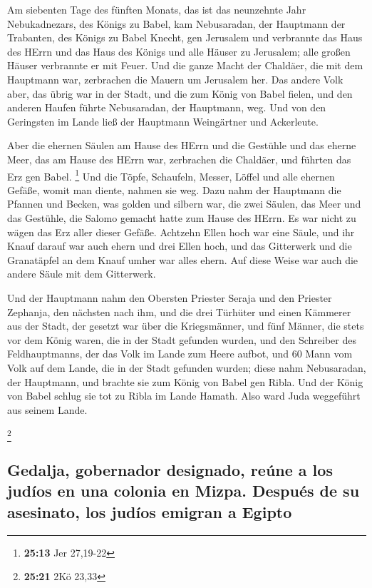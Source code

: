  Am siebenten Tage des fünften Monats, das ist das
neunzehnte Jahr Nebukadnezars, des Königs zu Babel, kam Nebusaradan, der
Hauptmann der Trabanten, des Königs zu Babel Knecht, gen Jerusalem
 und verbrannte das Haus des HErrn und das Haus des Königs
und alle Häuser zu Jerusalem; alle großen Häuser verbrannte er mit
Feuer.  Und die ganze Macht der Chaldäer, die mit dem
Hauptmann war, zerbrachen die Mauern um Jerusalem her. 
Das andere Volk aber, das übrig war in der Stadt, und die zum König von
Babel fielen, und den anderen Haufen führte Nebusaradan, der Hauptmann,
weg.  Und von den Geringsten im Lande ließ der Hauptmann
Weingärtner und Ackerleute.

 Aber die ehernen Säulen am Hause des HErrn und die
Gestühle und das eherne Meer, das am Hause des HErrn war, zerbrachen die
Chaldäer, und führten das Erz gen Babel. \footnote{\textbf{25:13} Jer
  27,19-22}  Und die Töpfe, Schaufeln, Messer, Löffel und
alle ehernen Gefäße, womit man diente, nahmen sie weg. 
Dazu nahm der Hauptmann die Pfannen und Becken, was golden und silbern
war,  die zwei Säulen, das Meer und das Gestühle, die
Salomo gemacht hatte zum Hause des HErrn. Es war nicht zu wägen das Erz
aller dieser Gefäße.  Achtzehn Ellen hoch war eine Säule,
und ihr Knauf darauf war auch ehern und drei Ellen hoch, und das
Gitterwerk und die Granatäpfel an dem Knauf umher war alles ehern. Auf
diese Weise war auch die andere Säule mit dem Gitterwerk.

 Und der Hauptmann nahm den Obersten Priester Seraja und
den Priester Zephanja, den nächsten nach ihm, und die drei Türhüter
 und einen Kämmerer aus der Stadt, der gesetzt war über
die Kriegsmänner, und fünf Männer, die stets vor dem König waren, die in
der Stadt gefunden wurden, und den Schreiber des Feldhauptmanns, der das
Volk im Lande zum Heere aufbot, und 60 Mann vom Volk auf dem Lande, die
in der Stadt gefunden wurden;  diese nahm Nebusaradan,
der Hauptmann, und brachte sie zum König von Babel gen Ribla.
 Und der König von Babel schlug sie tot zu Ribla im Lande
Hamath. Also ward Juda weggeführt aus seinem Lande.

\footnote{\textbf{25:21} 2Kö 23,33}

\hypertarget{gedalja-gobernador-designado-reuxfane-a-los-juduxedos-en-una-colonia-en-mizpa.-despuuxe9s-de-su-asesinato-los-juduxedos-emigran-a-egipto}{%
\subsection{Gedalja, gobernador designado, reúne a los judíos en una
colonia en Mizpa. Después de su asesinato, los judíos emigran a
Egipto}\label{gedalja-gobernador-designado-reuxfane-a-los-juduxedos-en-una-colonia-en-mizpa.-despuuxe9s-de-su-asesinato-los-juduxedos-emigran-a-egipto}}

